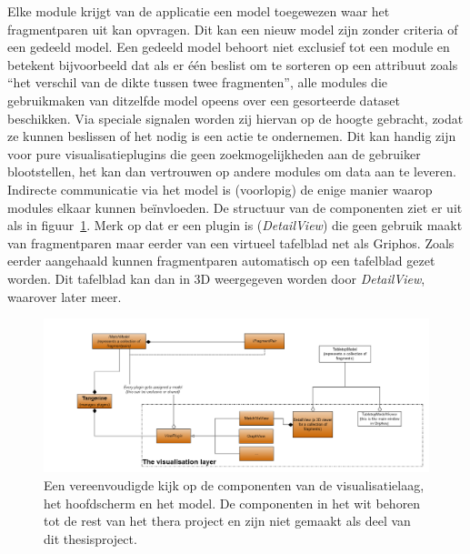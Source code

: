 Elke module krijgt van de applicatie een model toegewezen waar het fragmentparen uit kan opvragen. Dit kan een nieuw model zijn zonder criteria of een gedeeld model. Een gedeeld model behoort niet exclusief tot een module en betekent bijvoorbeeld dat als er \'e\'en beslist om te sorteren op een attribuut zoals ``het verschil van de dikte tussen twee fragmenten'', alle modules die gebruikmaken van ditzelfde model opeens over een gesorteerde dataset beschikken. Via speciale signalen worden zij hiervan op de hoogte gebracht, zodat ze kunnen beslissen of het nodig is een actie te ondernemen. Dit kan handig zijn voor pure visualisatieplugins die geen zoekmogelijkheden aan de gebruiker blootstellen, het kan dan vertrouwen op andere modules om data aan te leveren.\\

Indirecte communicatie via het model is (voorlopig) de enige manier waarop modules elkaar kunnen be\"invloeden. De structuur van de componenten ziet er uit als in figuur~\ref{fig:visualizationlayer}. Merk op dat er een plugin is (\emph{DetailView}) die geen gebruik maakt van fragmentparen maar eerder van een virtueel tafelblad net als Griphos. Zoals eerder aangehaald kunnen fragmentparen automatisch op een tafelblad gezet worden. Dit tafelblad kan dan in 3D weergegeven worden door \emph{DetailView}, waarover later meer.

\begin{figure}[h]
	\begin{center}
		\includegraphics[width=1.0\columnwidth]{images/VisualizationExtract.png}
		\caption{Een vereenvoudigde kijk op de componenten van de visualisatielaag, het hoofdscherm en het model. De componenten in het wit behoren tot de rest van het thera project en zijn niet gemaakt als deel van dit thesisproject.}
		\label{fig:visualizationlayer}
	\end{center}
\end{figure}

